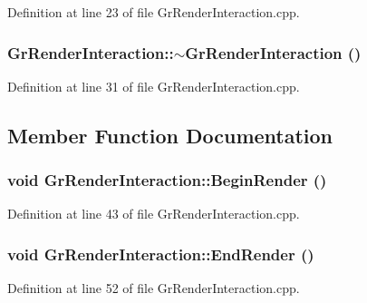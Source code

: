 \begin{CompactItemize}
Definition at line 23 of file GrRenderInteraction.cpp.\hypertarget{class_gr_render_interaction_570089439862a3a1d444108a4263069b}{
\subsubsection[{$\sim$GrRenderInteraction}]{\setlength{\rightskip}{0pt plus 5cm}GrRenderInteraction::$\sim$GrRenderInteraction ()}}
\label{class_gr_render_interaction_570089439862a3a1d444108a4263069b}




Definition at line 31 of file GrRenderInteraction.cpp.

\subsection{Member Function Documentation}
\hypertarget{class_gr_render_interaction_4acbd37e6393d7c7b7ed2e01258a4c25}{
\subsubsection[{BeginRender}]{\setlength{\rightskip}{0pt plus 5cm}void GrRenderInteraction::BeginRender ()}}
\label{class_gr_render_interaction_4acbd37e6393d7c7b7ed2e01258a4c25}




Definition at line 43 of file GrRenderInteraction.cpp.\hypertarget{class_gr_render_interaction_642460b8e369c750b07f01311e420881}{
\subsubsection[{EndRender}]{\setlength{\rightskip}{0pt plus 5cm}void GrRenderInteraction::EndRender ()}}
\label{class_gr_render_interaction_642460b8e369c750b07f01311e420881}




Definition at line 52 of file GrRenderInteraction.cpp.\hypertarget{class_gr_render_interaction_3542d05d0d9bd8f3ef237d46c518c2d4}{
}
\end{CompactItemize}

